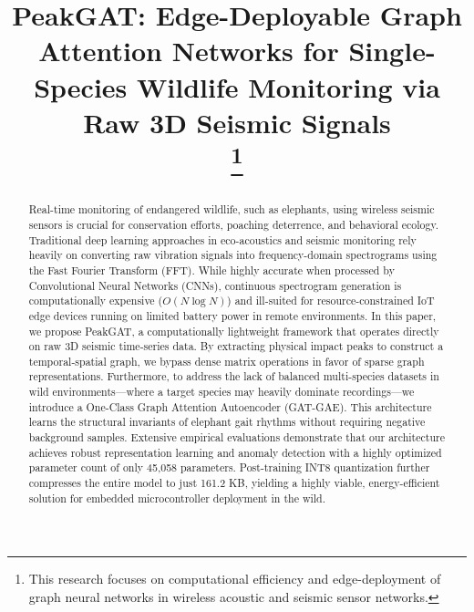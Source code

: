 \documentclass[conference, a4paper]{IEEEtran}
\begin{document}
\title{PeakGAT: Edge-Deployable Graph Attention Networks for Single-Species Wildlife Monitoring via Raw 3D Seismic Signals\\
\thanks{This research focuses on computational efficiency and edge-deployment of graph neural networks in wireless acoustic and seismic sensor networks.}
}

\author{
\and
{}
}

\maketitle

\begin{abstract}
Real-time monitoring of endangered wildlife, such as elephants, using wireless seismic sensors is crucial for conservation efforts, poaching deterrence, and behavioral ecology. Traditional deep learning approaches in eco-acoustics and seismic monitoring rely heavily on converting raw vibration signals into frequency-domain spectrograms using the Fast Fourier Transform (FFT). While highly accurate when processed by Convolutional Neural Networks (CNNs), continuous spectrogram generation is computationally expensive ($O(N \log N)$) and ill-suited for resource-constrained IoT edge devices running on limited battery power in remote environments. In this paper, we propose PeakGAT, a computationally lightweight framework that operates directly on raw 3D seismic time-series data. By extracting physical impact peaks to construct a temporal-spatial graph, we bypass dense matrix operations in favor of sparse graph representations. Furthermore, to address the lack of balanced multi-species datasets in wild environments—where a target species may heavily dominate recordings—we introduce a One-Class Graph Attention Autoencoder (GAT-GAE). This architecture learns the structural invariants of elephant gait rhythms without requiring negative background samples. Extensive empirical evaluations demonstrate that our architecture achieves robust representation learning and anomaly detection with a highly optimized parameter count of only 45,058 parameters. Post-training INT8 quantization further compresses the entire model to just 161.2 KB, yielding a highly viable, energy-efficient solution for embedded microcontroller deployment in the wild.
\end{abstract}
\end{document}
